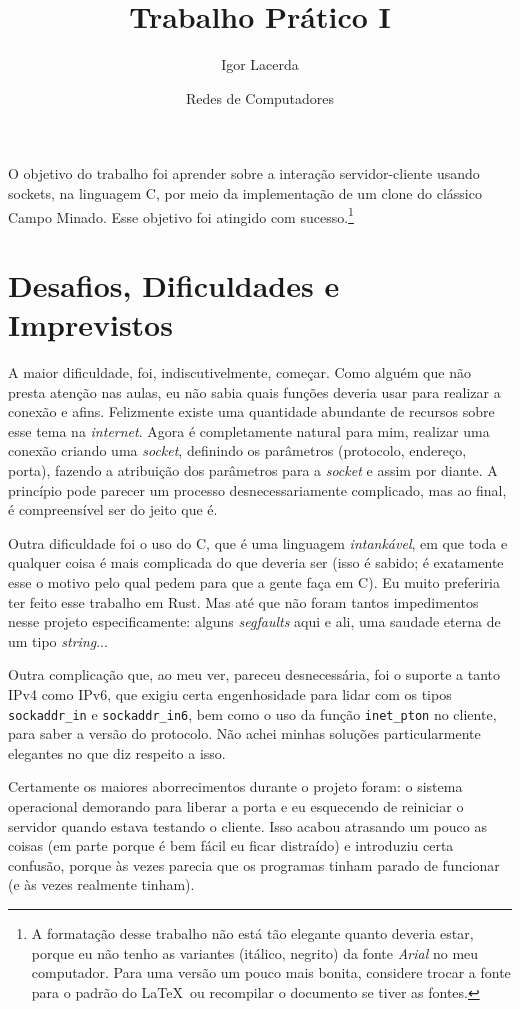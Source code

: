 \documentclass[12pt]{article}
\author{Igor Lacerda}
\title{Trabalho Prático I}
\date{Redes de Computadores}
\begin{document}
\maketitle

O objetivo do trabalho foi aprender sobre a interação servidor-cliente usando sockets, na linguagem C, por meio da implementação de um clone do clássico Campo Minado. Esse objetivo foi atingido com sucesso.\footnote{A formatação desse trabalho não está tão elegante quanto deveria estar, porque eu não tenho as variantes (itálico, negrito) da fonte \textit{Arial} no meu computador. Para uma versão um pouco mais bonita, considere trocar a fonte para o padrão do \LaTeX\ ou recompilar o documento se tiver as fontes.}

\section*{Desafios, Dificuldades e Imprevistos}

A maior dificuldade, foi, indiscutivelmente, começar. Como alguém que não presta atenção nas aulas, eu não sabia quais funções deveria usar para realizar a conexão e afins. Felizmente existe uma quantidade abundante de recursos sobre esse tema na \textit{internet}. Agora é completamente natural para mim, realizar uma conexão criando uma \textit{socket}, definindo os parâmetros (protocolo, endereço, porta), fazendo a atribuição dos parâmetros para a \textit{socket} e assim por diante. A princípio pode parecer um processo desnecessariamente complicado, mas ao final, é compreensível ser do jeito que é.

Outra dificuldade foi o uso do C, que é uma linguagem \emph{intankável}, em que toda e qualquer coisa é mais complicada do que deveria ser (isso é sabido; é exatamente esse o motivo pelo qual pedem para que a gente faça em C). Eu muito preferiria ter feito esse trabalho em Rust. Mas até que não foram tantos impedimentos nesse projeto especificamente: alguns \textit{segfaults} aqui e ali, uma saudade eterna de um tipo \textit{string}...

Outra complicação que, ao meu ver, pareceu desnecessária, foi o suporte a tanto IPv4 como IPv6, que exigiu certa engenhosidade para lidar com os tipos \texttt{sockaddr\_in} e \texttt{sockaddr\_in6}, bem como o uso da função \texttt{inet\_pton} no cliente, para saber a versão do protocolo. Não achei minhas soluções particularmente elegantes no que diz respeito a isso.

Certamente os maiores aborrecimentos durante o projeto foram: o sistema operacional demorando para liberar a porta e eu esquecendo de reiniciar o servidor quando estava testando o cliente. Isso acabou atrasando um pouco as coisas (em parte porque é bem fácil eu ficar distraído) e introduziu certa confusão, porque às vezes parecia que os programas tinham parado de funcionar (e às vezes realmente tinham).
\end{document}
